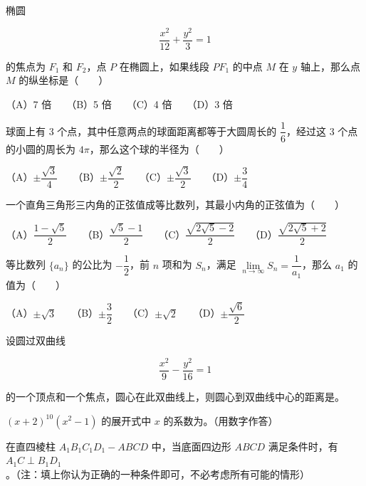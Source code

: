 \begin{question}
椭圆

\nopagebreak[4]
\[
\frac{x^2}{12}+\frac{y^2}{3}=1
\]

的焦点为 $F_1$ 和 $F_2$，点 $P$ 在椭圆上，如果线段 $PF_1$ 的中点 $M$ 在 $y$ 轴上，那么点 $M$ 的纵坐标是\mbox{（　　）}

（A）7 倍　　（B）5 倍　　（C）4 倍　　（D）3 倍

\end{question}
\begin{question}
球面上有 3 个点，其中任意两点的球面距离都等于大圆周长的 $\dfrac16$，经过这 3 个点的小圆的周长为 $4\pi$，那么这个球的半径为\mbox{（　　）}

（A）$\pm\dfrac{\sqrt3}4$　　（B）$\pm\dfrac{\sqrt2}2$　　（C）$\pm\dfrac{\sqrt3}2$　　（D）$\pm\dfrac34$

\end{question}
\begin{question}
一个直角三角形三内角的正弦值成等比数列，其最小内角的正弦值为\mbox{（　　）}

（A）$\dfrac{1-\sqrt5}2$　　（B）$\dfrac{\sqrt5-1}2$　　（C）$\dfrac{\sqrt{2\sqrt5-2}}2$　　（D）$\dfrac{\sqrt{2\sqrt5+2}}2$

\end{question}
\begin{question}
等比数列 $\{a_n\}$ 的公比为 $-\dfrac12$，前 $n$ 项和为 $S_n$，满足 $\lim\limits_{n\to\infty} S_n = \dfrac{1}{a_1}$，那么 $a_1$ 的值为\mbox{（　　）}

（A）$\pm\sqrt3$　　（B）$\pm\dfrac32$　　（C）$\pm\sqrt2$　　（D）$\pm\dfrac{\sqrt6}2$

\end{question}
\begin{question}
设圆过双曲线

\nopagebreak[4]
\[
\frac{x^2}{9}-\frac{y^2}{16}=1
\]

的一个顶点和一个焦点，圆心在此双曲线上，则圆心到双曲线中心的距离是\gkblank{}。

\end{question}
\begin{question}
$(x+2)^{10}(x^2-1)$ 的展开式中 $x$ 的系数为\gkblank{}。（用数字作答）

\end{question}
\begin{question}
在直四棱柱 $A_1B_1C_1D_1-ABCD$ 中，当底面四边形 $ABCD$ 满足条件\gkblank{}时，有 $A_1C\perp B_1D_1$。（注：填上你认为正确的一种条件即可，不必考虑所有可能的情形）

\end{question}
